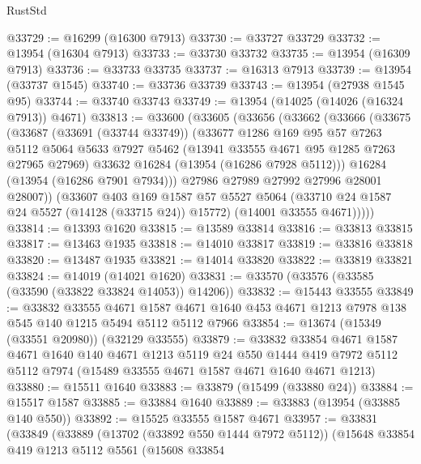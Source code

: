 \begin{lexlean}{RustStd}
\begin{coremodule}
@33729 := @16299 (@16300 @7913)
@33730 := @33727 @33729
@33732 := @13954 (@16304 @7913)
@33733 := @33730 @33732
@33735 := @13954 (@16309 @7913)
@33736 := @33733 @33735
@33737 := @16313 @7913
@33739 := @13954 (@33737 @1545)
@33740 := @33736 @33739
@33743 := @13954 (@27938 @1545 @95)
@33744 := @33740 @33743
@33749 := @13954 (@14025 (@14026 (@16324 @7913)) @4671)
@33813 := @33600
    (@33605
      (@33656
        (@33662
          (@33666
            (@33675
              (@33687
                (@33691 (@33744 @33749))
                (@33677
                  @1286
                  @169
                  @95
                  @57
                  @7263
                  @5112
                  @5064
                  @5633
                  @7927
                  @5462
                  (@13941 @33555 @4671 @95 @1285 @7263 @27965 @27969)
                  @33632
                  @16284
                  (@13954 (@16286 @7928 @5112)))
                @16284
                (@13954 (@16286 @7901 @7934)))
              @27986
              @27989
              @27992
              @27996
              @28001
              @28007))
          (@33607
            @403
            @169
            @1587
            @57
            @5527
            @5064
            (@33710 @24 @1587 @24 @5527 (@14128 (@33715 @24)) @15772)
            (@14001 @33555 @4671)))))
@33814 := @13393 @1620
@33815 := @13589 @33814
@33816 := @33813 @33815
@33817 := @13463 @1935
@33818 := @14010 @33817
@33819 := @33816 @33818
@33820 := @13487 @1935
@33821 := @14014 @33820
@33822 := @33819 @33821
@33824 := @14019 (@14021 @1620)
@33831 := @33570 (@33576 (@33585 (@33590 (@33822 @33824 @14053)) @14206))
@33832 := @15443 @33555
@33849 := @33832
    @33555
    @4671
    @1587
    @4671
    @1640
    @453
    @4671
    @1213
    @7978
    @138
    @545
    @140
    @1215
    @5494
    @5112
    @5112
    @7966
@33854 := @13674 (@15349 (@33551 @20980)) (@32129 @33555)
@33879 := @33832
    @33854
    @4671
    @1587
    @4671
    @1640
    @140
    @4671
    @1213
    @5119
    @24
    @550
    @1444
    @419
    @7972
    @5112
    @5112
    @7974
    (@15489 @33555 @4671 @1587 @4671 @1640 @4671 @1213)
@33880 := @15511 @1640
@33883 := @33879 (@15499 (@33880 @24))
@33884 := @15517 @1587
@33885 := @33884 @1640
@33889 := @33883 (@13954 (@33885 @140 @550))
@33892 := @15525 @33555 @1587 @4671
@33957 := @33831
    (@33849
      (@33889
        (@13702 (@33892 @550 @1444 @7972 @5112))
        (@15648
          @33854
          @419
          @1213
          @5112
          @5561
          (@15608
            @33854

\end{coremodule}
\end{lexlean}
